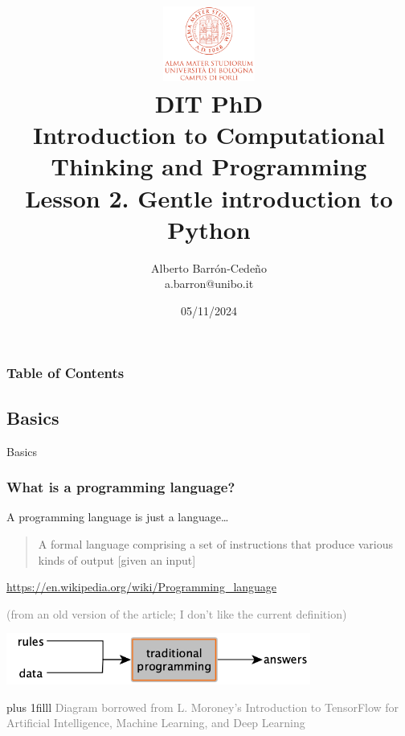 \documentclass[xcolor=x11names,handout]{beamer}
\title[DIT, PhD]{\vspace{-2pt}\\
\href{http://www.dit.unibo.it}{\includegraphics[width=30mm]{img/UNIBO_logo.png}
} \\
\vspace{6mm} {DIT PhD\\ Introduction to Computational Thinking and Programming} 
\\
{\large Lesson 2. Gentle introduction to Python}
\vspace{-5mm}}
\author[A. Barr\'on-Cede\~no]{{Alberto Barr\'on-Cede\~no \\ a.barron@unibo.it
\vspace{-8mm}}
\institute[DIT-UniBO]{DIT-UniBO}}
\date[2024]{05/11/2024}
\newcommand{\light}[1]{\textcolor{gray}{#1}}
\newcommand{\btVFill}{\vskip0pt plus 1filll}
\begin{document}
{%
	\begin{frame}[plain]
		\titlepage
	\end{frame}
}

\begin{frame}
\frametitle{Table of Contents}
\tableofcontents
\end{frame}


\begin{frame}
\section{Basics}
\centering
\alert{Basics}
\end{frame}


\begin{frame}
\frametitle{What is a programming language?}

A programming language is \alert{just a language}\ldots
\medskip 					\pause 

\begin{quote}
A formal language comprising a set of \alert{instructions} that produce 
various kinds of \alert{output} [given an input]
\end{quote}
\begin{flushright}
\footnotesize
 \light{\url{https://en.wikipedia.org/wiki/Programming_language}}
 
 \light{(from an old version of the article; I don't like the current 
definition)}
\end{flushright}			\pause 

\bigskip 
\begin{center}
\includegraphics[width=100mm]{img/coli2020_diagrams_traditional_programming.png}
\end{center}

\btVFill
\footnotesize
\light{Diagram borrowed from L. Moroney's Introduction to TensorFlow for 
Artificial Intelligence, Machine Learning, and Deep Learning}

\end{frame}
\end{document}
